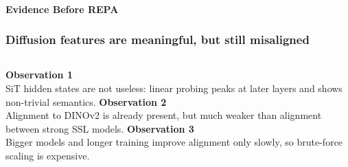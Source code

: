 \begin{frame}[t]
  \framesubtitle{Evidence Before REPA}
  \frametitle{Diffusion features are meaningful, but still misaligned}
  \FigTwo[width=\linewidth]
  \vspace{0.08cm}
  \begin{columns}[T,totalwidth=\textwidth]
    {\small \textbf{Observation 1}\\
    SiT hidden states are not useless: linear probing peaks at later layers and shows non-trivial semantics.
    }
    {\small \textbf{Observation 2}\\
    Alignment to DINOv2 is already present, but much weaker than alignment between strong SSL models.
    }
    {\small \textbf{Observation 3}\\
    Bigger models and longer training improve alignment only slowly, so brute-force scaling is expensive.
    }
  \end{columns}
\end{frame}

